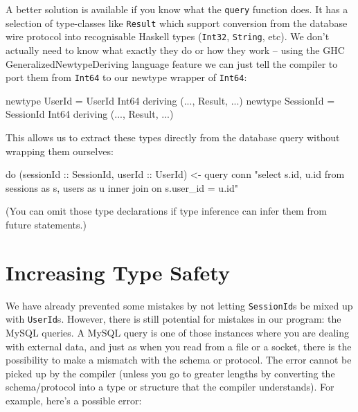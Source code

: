 \documentclass{tmr}
\begin{document}

A better solution is available if you know what the \lstinline|query| function does.  It has a selection of type-classes like \lstinline|Result| which support conversion from the database wire protocol into recognisable Haskell types (\lstinline|Int32|, \lstinline|String|, etc).  We don't actually need to know what exactly they do or how they work -- using the GHC GeneralizedNewtypeDeriving language feature we can just tell the compiler to port them from \lstinline|Int64| to our newtype wrapper of \lstinline|Int64|:

\begin{code}
newtype UserId = UserId Int64 deriving (..., Result, ...)
newtype SessionId = SessionId Int64 deriving (..., Result, ...)
\end{code}

This allows us to extract these types directly from the database query without wrapping them ourselves:

\begin{code}
do (sessionId :: SessionId, userId :: UserId) <- query conn "select
     s.id, u.id from sessions as s, users as u inner join on s.user_id = u.id"
\end{code}

(You can omit those type declarations if type inference can infer them from future statements.)

\section{Increasing Type Safety}

We have already prevented some mistakes by not letting \lstinline|SessionId|s be mixed up with \lstinline|UserId|s.  However, there is still potential for mistakes in our program: the MySQL queries.  A MySQL query is one of those instances where you are dealing with external data, and just as when you read from a file or a socket, there is the possibility to make a mismatch with the schema or protocol.  The error cannot be picked up by the compiler (unless you go to greater lengths by converting the schema/protocol into a type or structure that the compiler understands).  For example, here's a possible error:
\end{document}
